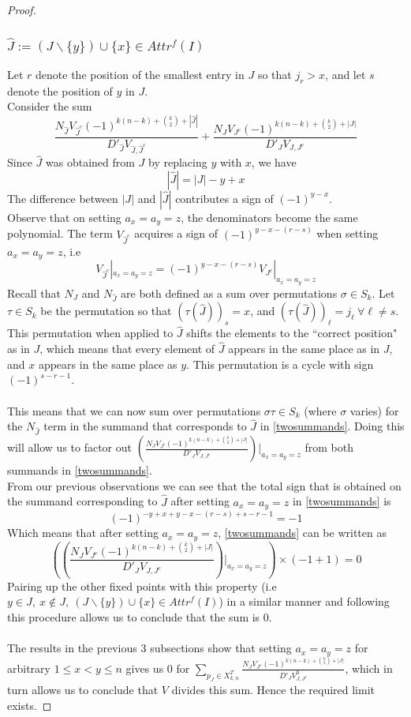 \documentclass[12 pt]{article}
\theoremstyle{plain}
\theoremstyle{plain}
\theoremstyle{plain}
\theoremstyle{plain}
\theoremstyle{plain}
\theoremstyle{plain}
\theoremstyle{plain}
\theoremstyle{plain}
\theoremstyle{plain}
\theoremstyle{plain}
\theoremstyle{remark}
\theoremstyle{remark}
\theoremstyle{definition}
\theoremstyle{definition}
\theoremstyle{definition}
\theoremstyle{definition}
\theoremstyle{definition}
\theoremstyle{definition}
\begin{document}
\begin{proof}
\subsubsection{$\hat{J}:=(J\backslash\{y\})\cup\{x\}\in Attr^{f}(I)$}
Let $r$ denote the position of the smallest entry in $J$ so that $j_{r}>x$, and let $s$ denote the position of $y$ in $J$. \\
Consider the sum 
\begin{equation}\label{twosummands}
    \frac{N_{\hat{J}}V_{\hat{J}^{c}}(-1)^{k(n-k)+\binom{k}{2}+|\hat{J}|}}{D'_{\hat{J}}V_{\hat{J},\hat{J}^{c}}}+
    \frac{N_{J}V_{J^{c}}(-1)^{k(n-k)+\binom{k}{2}+|J|}}{D'_{J}V_{J,J^{c}}}
\end{equation}
Since $\hat{J}$ was obtained from $J$ by replacing $y$ with $x$, we have \[|\hat{J}|=|J|-y+x\]
The difference between $|J|$ and $|\hat{J}|$ contributes a sign of $(-1)^{y-x}$.\\
Observe that on setting $a_{x}=a_{y}=z$, the denominators become the same polynomial. The term $V_{\hat{J}^{c}}$ acquires a sign of $(-1)^{y-x-(r-s)}$ when setting $a_{x}=a_{y}=z$, i.e 
\[V_{\hat{J}^{c}}|_{a_{x}=a_{y}=z}=(-1)^{y-x-(r-s)}V_{J^{c}}|_{a_{x}=a_{y}=z}\]
Recall that $N_{J}$ and $N_{\hat{J}}$ are both defined as a sum over permutations $\sigma\in S_{k}$. Let $\tau\in S_{k}$ be the permutation so that $(\tau(\hat{J}))_{s}=x$, and $(\tau(\hat{J}))_{\ell}=j_{\ell}\ \forall \ell\neq s$. This permutation when applied to $\hat{J}$ shifts the elements to the ``correct position" as in $J$, which means that every element of $\hat{J}$ appears in the same place as in $J$, and $x$ appears in the same place as $y$. This permutation is a cycle with sign $(-1)^{s-r-1}$.\\\\
This means that we can now sum over permutations $\sigma\tau\in S_{k}$ (where $\sigma$ varies) for the $N_{\hat{J}}$ term in the summand that corresponds to $\hat{J}$ in \eqref{twosummands}. Doing this will allow us to factor out $\left(\frac{N_{J}V_{J^{c}}(-1)^{k(n-k)+\binom{k}{2}+|J|}}{D'_{J}V_{J,J^{c}}}\right)|_{a_{x}=a_{y}=z}$ from both summands in \eqref{twosummands}.\\  
From our previous observations we can see that the total sign that is obtained on the summand corresponding to $\hat{J}$ after setting $a_{x}=a_{y}=z$ in \eqref{twosummands} is \[(-1)^{-y+x+y-x-(r-s)+s-r-1}=-1\]
Which means that after setting $a_{x}=a_{y}=z$, \eqref{twosummands} can be written as
\[\left(\left(\frac{N_{J}V_{J^{c}}(-1)^{k(n-k)+\binom{k}{2}+|J|}}{D'_{J}V_{J,J^{c}}}\right)|_{a_{x}=a_{y}=z}\right)\times(-1+1)=0\]
Pairing up the other fixed points with this property (i.e $y\in J,\ x\notin J,\ (J\backslash\{y\})\cup\{x\}\in Attr^{f}(I)$) in a similar manner and following this procedure allows us to conclude that the sum is 0.\\\\
The results in the previous 3 subsections show that setting $a_{x}=a_{y}=z$ for arbitrary $1\leq x<y\leq n$ gives us 0 for $\sum_{p_{J}\in X_{k,n}^{T}}\frac{N_{J}V_{J^{c}}(-1)^{k(n-k)+\binom{k}{2}+|J|}}{D'_{J}V_{J,J^{c}}^{\hbar}}$, which in turn allows us to conclude that $V$ divides this sum. Hence the required limit exists.
\end{proof}
\end{document}
